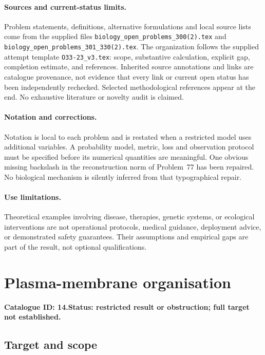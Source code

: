\documentclass[11pt]{article}
\begin{document}
\paragraph{Sources and current-status limits.}
Problem statements, definitions, alternative formulations and local source lists
come from the supplied files
\texttt{biology\_open\_problems\_300(2).tex} and
\texttt{biology\_open\_problems\_301\_330(2).tex}.
The organization follows the supplied attempt template
\texttt{O33-23\_v3.tex}: scope, substantive calculation, explicit gap,
completion estimate, and references. Inherited source annotations and links are
catalogue provenance, not evidence that every link or current open status has
been independently rechecked. Selected methodological references appear at the
end. No exhaustive literature or novelty audit is claimed.

\paragraph{Notation and corrections.}
Notation is local to each problem and is restated when a restricted model uses
additional variables. A probability model, metric, loss and observation protocol
must be specified before its numerical quantities are meaningful. One obvious
missing backslash in the reconstruction norm of Problem~77 has been repaired.
No biological mechanism is silently inferred from that typographical repair.

\paragraph{Use limitations.}
Theoretical examples involving disease, therapies, genetic systems, or ecological
interventions are not operational protocols, medical guidance, deployment advice,
or demonstrated safety guarantees. Their assumptions and empirical gaps are part
of the result, not optional qualifications.

\setcounter{section}{13}
\section{Plasma-membrane organisation}
\label{prob:014}
\noindent\textbf{Catalogue ID: 14.}\quad \textbf{Status: restricted result or obstruction; full target not established.}
\subsection{Target and scope}
\end{document}
